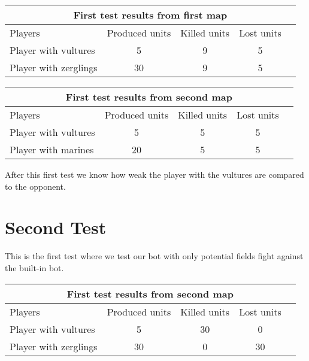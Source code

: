 \begin{centering}
 \begin{tabular}{|l||c|c|c|c|}
	\multicolumn{5}{c}{First test results from first map} \\
	\hline
	Players & Produced units & Killed units & Lost units\\
	\hline
	\hline
		Player with vultures & 5 & 9 & 5 \\
	\hline
		Player with zerglings & 30 & 9 & 5\\
	\hline

\end{tabular}
\end{centering}
\begin{centering}
 \begin{tabular}{|l||c|c|c|c|}
	\multicolumn{5}{c}{First test results from second map} \\
	\hline
	Players & Produced units & Killed units & Lost units\\
	\hline
		Player with vultures & 5 & 5 & 5\\
	\hline
		Player with marines & 20 & 5 & 5\\
	\hline

\end{tabular}
\end{centering}

After this first test we know how weak the player with the vultures are compared to the opponent.

\section{Second Test} %
This is the first test where we test our bot with only potential fields fight against the built-in bot.

\begin{centering}
 \begin{tabular}{|l||c|c|c|c|}
	\multicolumn{5}{c}{First test results from second map} \\
	\hline
	Players & Produced units & Killed units & Lost units\\
	\hline
	\hline
		Player with vultures & 5 & 30 & 0\\
	\hline
		Player with zerglings & 30 & 0 & 30\\
	\hline

\end{tabular}
\end{centering}

